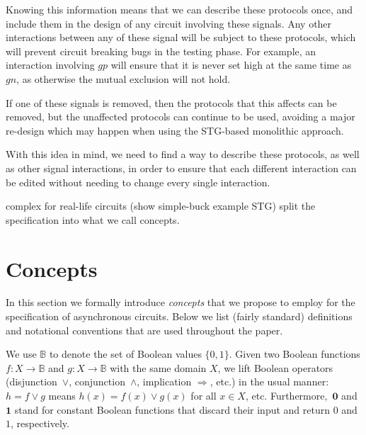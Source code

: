 \documentclass[british, journal]{IEEEtran}
\begin{document}
Knowing this information means that we can describe these protocols once, and
include them in the design of any circuit involving these signals. Any other
interactions between any of these signal will be subject to these protocols,
which will prevent circuit breaking bugs in the testing phase. For example, an
interaction involving $gp$ will ensure that it is never set high at
the same time as $gn$, as otherwise the mutual exclusion will not hold.

If one of these signals is removed, then the protocols that this affects can
be removed, but the unaffected protocols can continue to be used, avoiding a
major re-design which may happen when using the STG-based monolithic approach.

With this idea in mind, we need to find a way to describe these protocols, as
well as other signal interactions, in order to ensure that each different
interaction can be edited without needing to change every single interaction.

complex for real-life circuits (show simple-buck example STG)
split the specification into what we call concepts.
\vspace{-2mm}
\section{Concepts \label{sec:Concepts}}

In this section we formally introduce \emph{concepts} that we propose
to employ for the specification of asynchronous circuits. Below we
list (fairly standard) definitions and notational conventions that
are used throughout the paper.

We use $\mathbb{B}$ to denote the set of Boolean values $\{0,1\}$.
Given two Boolean functions $f:X\rightarrow\mathbb{B}$ and
$g:X\rightarrow\mathbb{B}$
with the same domain $X$, we lift Boolean operators (disjunction~$\vee$,
conjunction~$\wedge$, implication $\Rightarrow$, etc.) in the usual
manner: $h=f\vee g$ means $h(x)=f(x)\vee g(x)$ for all $x\in X$,
etc. Furthermore,~$\mathbf{0}$ and~$\mathbf{1}$ stand for constant
Boolean functions that discard their input and return $0$
and $1$, respectively.
\end{document}
